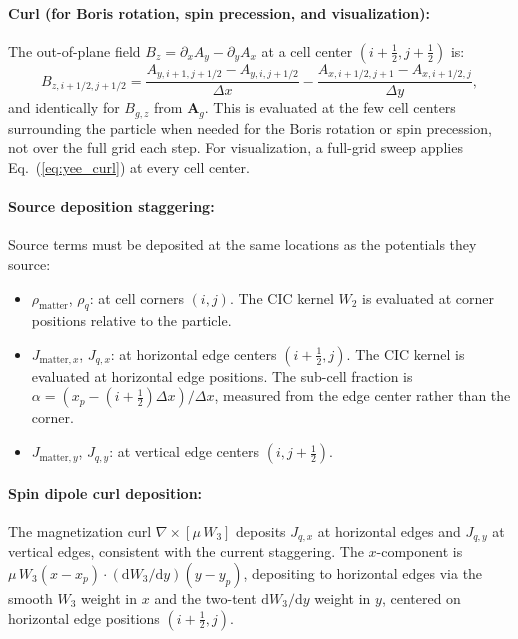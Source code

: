 \documentclass[11pt,a4paper]{article}
\newcommand{\vv}[1]{\mathbf{#1}}
\newcommand{\Ag}{\vv{A}_g}
\newcommand{\dd}{\mathrm{d}}
\begin{document}
\paragraph{Curl (for Boris rotation, spin precession, and visualization):}
The out-of-plane field $B_z = \partial_x A_y - \partial_y A_x$ at a cell center $(i+\tfrac{1}{2}, j+\tfrac{1}{2})$ is:
\begin{equation}
\label{eq:yee_curl}
  B_{z,i+1/2,j+1/2} = \frac{A_{y,i+1,j+1/2} - A_{y,i,j+1/2}}{\Delta x}
                     - \frac{A_{x,i+1/2,j+1} - A_{x,i+1/2,j}}{\Delta y},
\end{equation}
and identically for $B_{g,z}$ from $\Ag$.  This is evaluated at the few cell centers surrounding the particle when needed for the Boris rotation or spin precession, not over the full grid each step.  For visualization, a full-grid sweep applies Eq.~(\ref{eq:yee_curl}) at every cell center.

\paragraph{Source deposition staggering:}
Source terms must be deposited at the same locations as the potentials they source:
\begin{itemize}
  \item $\rho_{\mathrm{matter}}$, $\rho_q$: at cell corners $(i,j)$.  The CIC kernel $W_2$ is evaluated at corner positions relative to the particle.
  \item $J_{\mathrm{matter},x}$, $J_{q,x}$: at horizontal edge centers $(i+\tfrac{1}{2},j)$.  The CIC kernel is evaluated at horizontal edge positions.  The sub-cell fraction is $\alpha = (x_p - (i+\tfrac{1}{2})\Delta x)/\Delta x$, measured from the edge center rather than the corner.
  \item $J_{\mathrm{matter},y}$, $J_{q,y}$: at vertical edge centers $(i,j+\tfrac{1}{2})$.
\end{itemize}

\paragraph{Spin dipole curl deposition:}
The magnetization curl $\nabla\times[\mu\,W_3]$ deposits $J_{q,x}$ at horizontal edges and $J_{q,y}$ at vertical edges, consistent with the current staggering.  The $x$-component is $\mu\,W_3(x-x_p)\cdot(\dd W_3/\dd y)(y-y_p)$, depositing to horizontal edges via the smooth $W_3$ weight in $x$ and the two-tent $\dd W_3/\dd y$ weight in $y$, centered on horizontal edge positions $(i+\tfrac{1}{2}, j)$.
\end{document}
